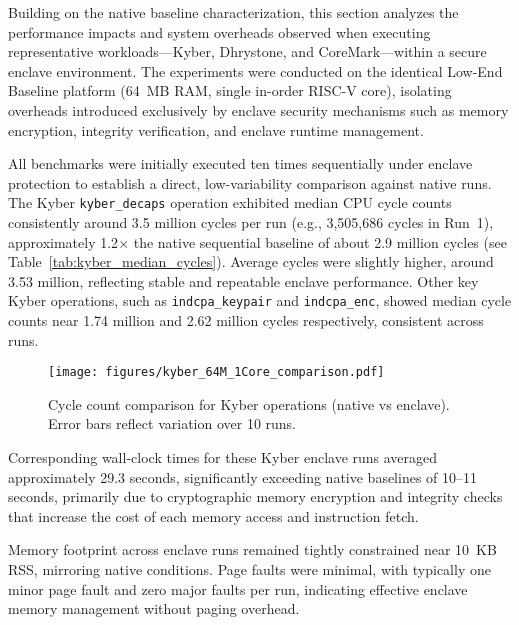 Building on the native baseline characterization, this section analyzes the performance impacts and system overheads observed when executing representative workloads—Kyber, Dhrystone, and CoreMark—within a secure enclave environment. The experiments were conducted on the identical Low-End Baseline platform (64~MB RAM, single in-order RISC-V core), isolating overheads introduced exclusively by enclave security mechanisms such as memory encryption, integrity verification, and enclave runtime management.

All benchmarks were initially executed ten times sequentially under enclave protection to establish a direct, low-variability comparison against native runs. The Kyber \texttt{kyber\_decaps} operation exhibited median CPU cycle counts consistently around 3.5 million cycles per run (e.g., 3,505,686 cycles in Run~1), approximately 1.2$\times$ the native sequential baseline of about 2.9 million cycles (see Table~\ref{tab:kyber_median_cycles}). Average cycles were slightly higher, around 3.53 million, reflecting stable and repeatable enclave performance. Other key Kyber operations, such as \texttt{indcpa\_keypair} and \texttt{indcpa\_enc}, showed median cycle counts near 1.74 million and 2.62 million cycles respectively, consistent across runs.

\begin{figure}[h]
    \centering
    \texttt{[image: figures/kyber\_64M\_1Core\_comparison.pdf]}
    \caption{Cycle count comparison for Kyber operations (native vs enclave). Error bars reflect variation over 10 runs.}
    \label{fig:kyber_cycles}
\end{figure}

Corresponding wall-clock times for these Kyber enclave runs averaged approximately 29.3 seconds, significantly exceeding native baselines of 10--11 seconds, primarily due to cryptographic memory encryption and integrity checks that increase the cost of each memory access and instruction fetch.


Memory footprint across enclave runs remained tightly constrained near 10~KB RSS, mirroring native conditions. Page faults were minimal, with typically one minor page fault and zero major faults per run, indicating effective enclave memory management without paging overhead.

